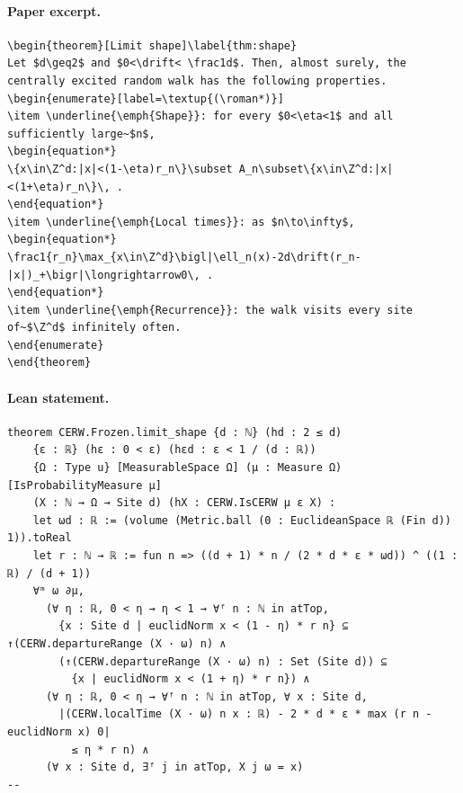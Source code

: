 \paragraph{Paper excerpt.}
\begin{verbatim}
\begin{theorem}[Limit shape]\label{thm:shape}
Let $d\geq2$ and $0<\drift< \frac1d$. Then, almost surely, the centrally excited random walk has the following properties.
\begin{enumerate}[label=\textup{(\roman*)}]
\item \underline{\emph{Shape}}: for every $0<\eta<1$ and all sufficiently large~$n$,
\begin{equation*}
\{x\in\Z^d:|x|<(1-\eta)r_n\}\subset A_n\subset\{x\in\Z^d:|x|<(1+\eta)r_n\}\, .
\end{equation*}
\item \underline{\emph{Local times}}: as $n\to\infty$,
\begin{equation*}
\frac1{r_n}\max_{x\in\Z^d}\bigl|\ell_n(x)-2d\drift(r_n-|x|)_+\bigr|\longrightarrow0\, .
\end{equation*}
\item \underline{\emph{Recurrence}}: the walk visits every site of~$\Z^d$ infinitely often.
\end{enumerate}
\end{theorem}
\end{verbatim}
\paragraph{Lean statement.}
\begin{verbatim}
theorem CERW.Frozen.limit_shape {d : ℕ} (hd : 2 ≤ d)
    {ε : ℝ} (hε : 0 < ε) (hεd : ε < 1 / (d : ℝ))
    {Ω : Type u} [MeasurableSpace Ω] (μ : Measure Ω) [IsProbabilityMeasure μ]
    (X : ℕ → Ω → Site d) (hX : CERW.IsCERW μ ε X) :
    let ωd : ℝ := (volume (Metric.ball (0 : EuclideanSpace ℝ (Fin d)) 1)).toReal
    let r : ℕ → ℝ := fun n => ((d + 1) * n / (2 * d * ε * ωd)) ^ ((1 : ℝ) / (d + 1))
    ∀ᵐ ω ∂μ,
      (∀ η : ℝ, 0 < η → η < 1 → ∀ᶠ n : ℕ in atTop,
        {x : Site d | euclidNorm x < (1 - η) * r n} ⊆ ↑(CERW.departureRange (X · ω) n) ∧
        (↑(CERW.departureRange (X · ω) n) : Set (Site d)) ⊆
          {x | euclidNorm x < (1 + η) * r n}) ∧
      (∀ η : ℝ, 0 < η → ∀ᶠ n : ℕ in atTop, ∀ x : Site d,
        |(CERW.localTime (X · ω) n x : ℝ) - 2 * d * ε * max (r n - euclidNorm x) 0|
          ≤ η * r n) ∧
      (∀ x : Site d, ∃ᶠ j in atTop, X j ω = x)
--
\end{verbatim}
